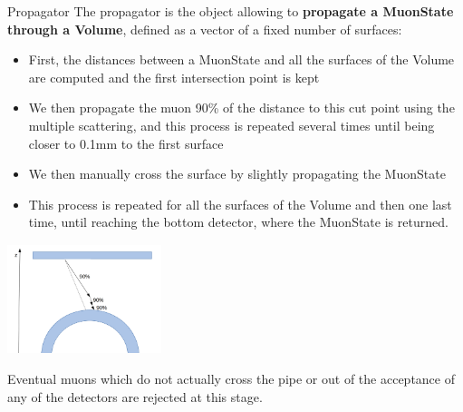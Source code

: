 \documentclass[8 pt]{beamer}
\begin{document}
\begin{frame}{Propagator}
\justifying
The propagator is the object allowing to \textbf{propagate a MuonState through a Volume}, defined as a vector of a fixed number of surfaces: \vfill

\begin{minipage}[c]{.59\textwidth}
\begin{itemize}
\justifying
\item First, the distances between a MuonState and all the surfaces of the Volume are computed and the first intersection point is kept
\item We then propagate the muon 90\% of the distance to this cut point using the multiple scattering, and this process is repeated several times until being closer to 0.1mm to the first surface
\item We then manually cross the surface by slightly propagating the MuonState
\item This process is repeated for all the surfaces of the Volume and then one last time, until reaching the bottom detector, where the MuonState is returned.
\end{itemize}
\end{minipage}
\begin{minipage}[c]{.40\textwidth}
\includegraphics[width=4.5cm, height=3.2cm]{figs/propagation.png}
\end{minipage} \vfill

Eventual muons which do not actually cross the pipe or out of the acceptance of any of the detectors are rejected at this stage. \vfill
\end{frame}
\end{document}
